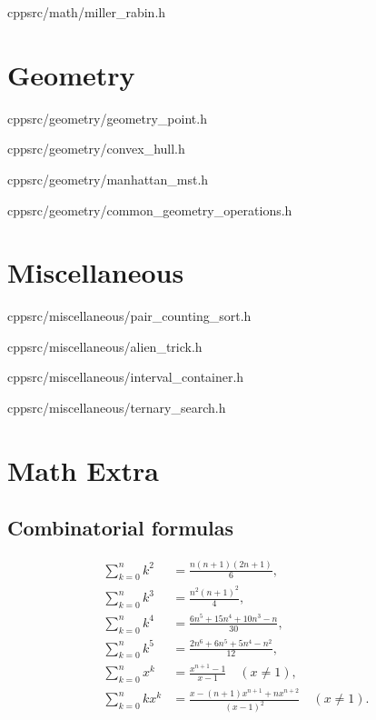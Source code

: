 \documentclass[portrait, 8pt, a4paper, oneside, twocolumn]{extarticle}
\begin{document}

    {}
    {}
    {cpp}{src/math/miller_rabin.h}
    \noindent\hrulefill

\section{Geometry}
    {}
    {}
    {cpp}{src/geometry/geometry_point.h}
    \noindent\hrulefill

    {}
    {}
    {cpp}{src/geometry/convex_hull.h}
    \noindent\hrulefill

    {}
    {}
    {cpp}{src/geometry/manhattan_mst.h}
    \noindent\hrulefill

    {}
    {}
    {cpp}{src/geometry/common_geometry_operations.h}
    \noindent\hrulefill

\section{Miscellaneous}
	{}
	{}
	{cpp}{src/miscellaneous/pair_counting_sort.h}
	\noindent\hrulefill

	{}
	{}
	{cpp}{src/miscellaneous/alien_trick.h}
	\noindent\hrulefill

	{}
	{}
	{cpp}{src/miscellaneous/interval_container.h}
	\noindent\hrulefill

	{}
	{}
	{cpp}{src/miscellaneous/ternary_search.h}
	\noindent\hrulefill

\section{Math Extra}

\subsection{Combinatorial formulas}
\begin{align*}
\sum_{k=0}^{n}k^2 &= \frac{n(n+1)(2n+1)}{6},\\
\sum_{k=0}^{n}k^3 &= \frac{n^2(n+1)^2}{4},\\
\sum_{k=0}^{n}k^4 &= \frac{6n^5+15n^4+10n^3-n}{30},\\
\sum_{k=0}^{n}k^5 &= \frac{2n^6+6n^5+5n^4-n^2}{12},\\
\sum_{k=0}^{n}x^k &= \frac{x^{n+1}-1}{x-1}\quad(x\ne1),\\
\sum_{k=0}^{n}kx^k &= \frac{x-(n+1)x^{n+1}+nx^{n+2}}{(x-1)^2}\quad(x\ne1).
\end{align*}
\end{document}
